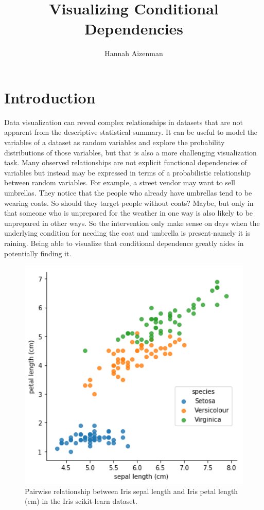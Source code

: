 \documentclass[letterpaper,onecolumn,titlepage]{Ythesis}
\title{Visualizing Conditional Dependencies}
\author{Hannah Aizenman}
\begin{document}
\makefrontmatter

\section{Introduction}
\label{sec:introduction}
Data visualization can reveal complex relationships in datasets that are not apparent from the descriptive statistical summary\cite{anscombe_graphs_1973}. It can be useful to model the variables of a dataset as random variables and explore the probability distributions of those variables, but that is also a more challenging visualization task. Many observed relationships are not explicit functional dependencies of variables but instead may be expressed in terms of a probabilistic relationship between random variables. For example, a street vendor may want to sell umbrellas. They notice that the people who already have umbrellas tend to be wearing coats. So should they target people without coats? Maybe, but only in that someone who is unprepared for the weather in one way is also likely to be unprepared in other ways. So the intervention only make sense on days when the underlying condition for needing the coat and umbrella is present-namely it is raining. Being able to visualize that conditional dependence greatly aides in potentially finding it. 

\begin{figure}[H]
	\center
	\includegraphics[width=1\textwidth]{intro/iris_scatter.png}
  	\caption{Pairwise relationship between Iris sepal length and Iris petal length (cm) in the Iris scikit-learn dataset\cite{scikit-learn}.}
  	\label{fig:iris_scatter}
\end{figure}
\end{document}
